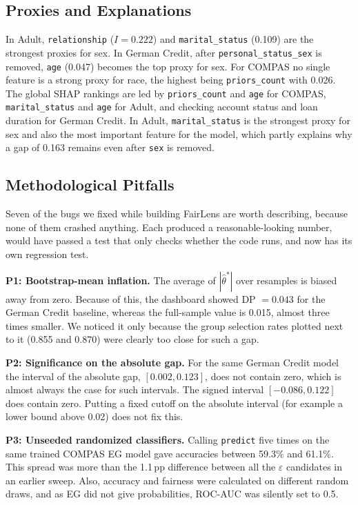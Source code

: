 \documentclass[conference]{IEEEtran}
\newcommand{\eps}{\varepsilon}
\begin{document}
\subsection{Proxies and Explanations}
In Adult, \texttt{relationship} ($I=0.222$) and \texttt{marital\_status} (0.109) are the strongest proxies for sex. In German Credit, after \texttt{personal\_status\_sex} is removed, \texttt{age} (0.047) becomes the top proxy for sex. For COMPAS no single feature is a strong proxy for race, the highest being \texttt{priors\_count} with 0.026. The global SHAP rankings are led by \texttt{priors\_count} and \texttt{age} for COMPAS, \texttt{marital\_status} and \texttt{age} for Adult, and checking account status and loan duration for German Credit. In Adult, \texttt{marital\_status} is the strongest proxy for sex and also the most important feature for the model, which partly explains why a gap of 0.163 remains even after \texttt{sex} is removed.

\subsection{Methodological Pitfalls}\label{sec:pitfalls}
Seven of the bugs we fixed while building FairLens are worth describing, because none of them crashed anything. Each produced a reasonable-looking number, would have passed a test that only checks whether the code runs, and now has its own regression test.

\textbf{P1: Bootstrap-mean inflation.} The average of $|\hat\theta^*|$ over resamples is biased away from zero. Because of this, the dashboard showed DP $=0.043$ for the German Credit baseline, whereas the full-sample value is 0.015, almost three times smaller. We noticed it only because the group selection rates plotted next to it (0.855 and 0.870) were clearly too close for such a gap.

\textbf{P2: Significance on the absolute gap.} For the same German Credit model the interval of the absolute gap, $[0.002, 0.123]$, does not contain zero, which is almost always the case for such intervals. The signed interval $[-0.086, 0.122]$ does contain zero. Putting a fixed cutoff on the absolute interval (for example a lower bound above 0.02) does not fix this.

\textbf{P3: Unseeded randomized classifiers.} Calling \texttt{predict} five times on the same trained COMPAS EG model gave accuracies between 59.3\% and 61.1\%. This spread was more than the 1.1\,pp difference between all the $\eps$ candidates in an earlier sweep. Also, accuracy and fairness were calculated on different random draws, and as EG did not give probabilities, ROC-AUC was silently set to 0.5.
\end{document}
